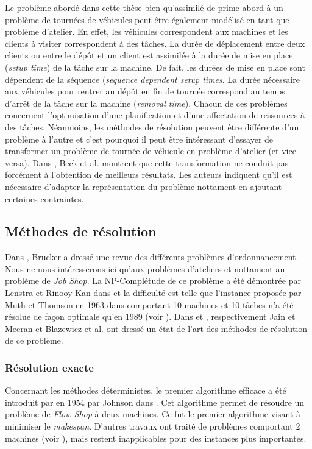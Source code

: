 Le problème abordé dans cette thèse bien qu'assimilé de prime abord à un problème de tournées de véhicules peut être également modélisé en tant que problème d'atelier. En effet, les véhicules correspondent aux machines et les clients à visiter correspondent à des tâches. La durée de déplacement entre deux clients ou entre le dépôt et un client est assimilée à la durée de mise en place (\textit{setup time}) de la tâche sur la machine. De fait, les durées de mise en place sont dépendent de la séquence (\textit{sequence dependent setup times}. La durée nécessaire aux véhicules pour rentrer au dépôt en fin de tournée correspond au temps d'arrêt de la tâche sur la machine (\textit{removal time}).
Chacun de ces problèmes concernent l'optimisation d'une planification et d'une affectation de ressources à des tâches. Néanmoins, les méthodes de résolution peuvent être différente d'un problème à l'autre et c'est pourquoi il peut être intéressant d'essayer de transformer un problème de tournée de véhicule en problème d'atelier (et vice versa).
Dans \cite{Beck2003,Beck2006}, Beck et al. montrent que cette transformation ne conduit pas forcément à l'obtention de meilleurs résultats. Les auteurs indiquent qu'il est nécessaire d'adapter la représentation du problème nottament en ajoutant certaines contraintes.

\subsection{Méthodes de résolution}

Dans \cite{Brucker2007}, Brucker a dressé une revue des différents problèmes d'ordonnancement. Nous ne nous intéresserons ici qu'aux problèmes d'ateliers et nottament au problème de \textit{Job Shop}. La NP-Complétude de ce problème a été démontrée par Lenstra et Rinooy Kan dans \cite{Lenstra1979} et la difficulté est telle que l'instance proposée par Muth et Thomson en 1963 dans \cite{Muth1963} comportant 10 machines et 10 tâches n'a été résolue de façon optimale qu'en 1989 (voir \cite{Carlier1989}). Dans \cite{Jain1998} et \cite{Blazewicz1996}, respectivement Jain et Meeran et Blazewicz et al. ont dressé un état de l'art des méthodes de résolution de ce problème.

\subsubsection{Résolution exacte}
Concernant les méthodes déterministes, le premier algorithme efficace a été introduit par en 1954 par Johnson dans \cite{Johnson1954}. Cet algorithme permet de résoudre un problème de \textit{Flow Shop} à deux machines. Ce fut le premier algorithme visant à minimiser le \textit{makespan}. D'autres travaux ont traité de problèmes comportant 2 machines (voir \cite{Akers1956,Jackson1956,Hefetz1982}), mais restent inapplicables pour des instances plus importantes.

